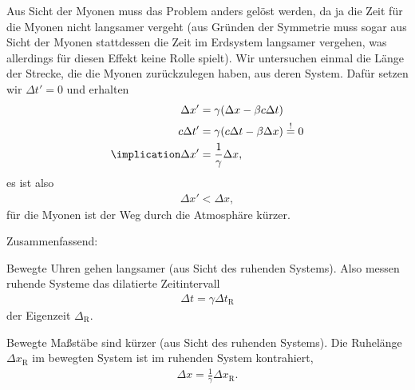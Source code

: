 Aus Sicht der Myonen muss das Problem anders gelöst werden, da ja die Zeit für die Myonen nicht langsamer vergeht
(aus Gründen der Symmetrie muss sogar aus Sicht der Myonen stattdessen die Zeit im Erdsystem langsamer vergehen, was allerdings für diesen Effekt keine Rolle spielt).
Wir untersuchen einmal die Länge der Strecke, die die Myonen zurückzulegen haben, aus deren System. Dafür setzen wir $\Delta t'=0$ und erhalten
\begin{align}
    \Delta x'              & = \gamma(\Delta x-\beta c\Delta t)                   \nonumber \\
    c\Delta t'             & = \gamma(c \Delta t-\beta \Delta x) \overset{!}{=} 0 \nonumber \\
    \label{eq:laengenkontraktion}
    \implication \Delta x' & = \frac{1}{\gamma}\Delta x,
\end{align}
es ist also
\begin{align*}
    \Delta x'< \Delta x,
\end{align*}
für die Myonen ist der Weg durch die Atmosphäre kürzer.

Zusammenfassend:
\begin{formal}
    Bewegte Uhren gehen langsamer (aus Sicht des ruhenden Systems). Also messen ruhende Systeme das dilatierte Zeitintervall
    \begin{align*}
        \Delta t = \gamma \Delta t_\text{R}
    \end{align*}
    der Eigenzeit $\Delta_\text{R}$.
\end{formal}
\begin{formal}
    Bewegte Maßstäbe sind kürzer (aus Sicht des ruhenden Systems). Die Ruhelänge $\Delta x_\text{R}$ im bewegten System ist im ruhenden System kontrahiert\footnotemark,
    \begin{align*}
        \Delta x = \frac{1}{\gamma} \Delta x_\text{R}.
    \end{align*}
\end{formal}

